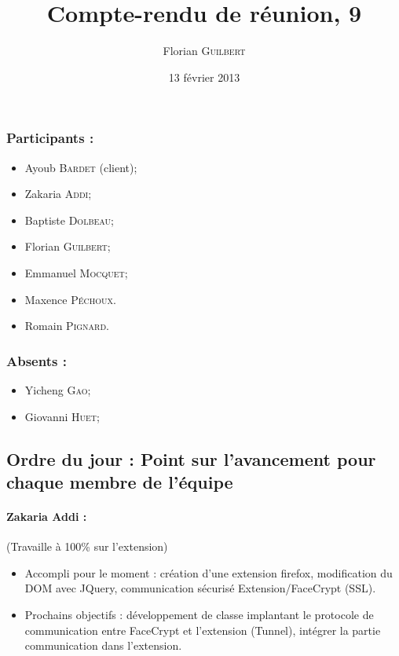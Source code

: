 \documentclass[a4paper,10pt]{article}
\author{Florian \textsc{Guilbert}}
\title{Compte-rendu de réunion, 9}
\date{13 février 2013}
\begin{document}
\maketitle

\subsubsection*{Participants : }
\begin{itemize}
    \item Ayoub \textsc{Bardet} (client);
    \item Zakaria \textsc{Addi};
    \item Baptiste \textsc{Dolbeau};
    \item Florian \textsc{Guilbert};
    \item Emmanuel \textsc{Mocquet};
    \item Maxence  \textsc{Péchoux}.
    \item Romain \textsc{Pignard}.
\end{itemize}

\subsubsection*{Absents : }
\begin{itemize}
    \item Yicheng \textsc{Gao};
    \item Giovanni \textsc{Huet};
\end{itemize}

\subsection*{Ordre du jour : Point sur l'avancement pour chaque membre de l'équipe}


\paragraph{Zakaria Addi :} (Travaille à 100\% sur l'extension)\\
\begin{itemize}
    \item Accompli pour le moment : création d'une extension firefox, modification
        du DOM avec JQuery, communication sécurisé Extension/FaceCrypt (SSL).
    \item Prochains objectifs : développement de classe implantant le protocole
        de communication entre FaceCrypt et l'extension (Tunnel), intégrer la
        partie communication dans l'extension.
\end{itemize}
\end{document}
